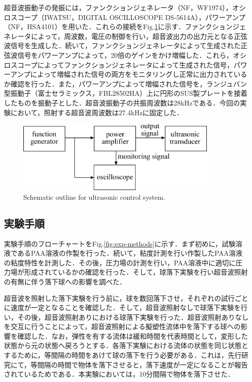 超音波振動子の発振には，ファンクションジェネレータ（NF，WF1974），オシロスコープ（IWATSU，DIGITAL OSCILLOSCOPE DS-5614A），パワーアンプ（NF，HSA4101）を用いた．これらの接続をFig.\ref{fig:connect-with-signal}に示す．ファンクションジェネレータによって，周波数，電圧の制御を行い，超音波出力の出力元となる正弦波信号を生成した．続いて，ファンクションジェネレータによって生成された正弦波信号をパワーアンプによって，20倍のゲインをかけ増幅した．これら，オシロスコープによってファンクションジェネレータによって生成された信号，パワーアンプによって増幅された信号の両方をモニタリングし正常に出力されているか確認を行った．また，パワーアンプによって増幅された信号を，ランジュバン型振動子（富士セラミックス，FBL28502HA）上に円形のSUS製プレートを接着したものを振動子とした．超音波振動子の共振周波数は28kHzである．今回の実験において，照射する超音波周波数は27.4kHzに固定した．

\begin{figure}[h]
    \centering
    \includegraphics[clip,width=10.0cm]{2-Methods/connect-with-signal.png}
    \caption{Schematic outline for ultrasonic control system.}
    \label{fig:connect-with-signal}
\end{figure}

\subsection{実験手順}

実験手順のフローチャートをFig.\ref{fig:exp-methods}に示す．まず初めに，試験溶液であるPAA溶液の作製を行った．続いて，粘度計測を行い作製したPAA溶液の粘度特性を計測した．その後，圧力場の計測を行い，PAA溶液中に適切に圧力場が形成されているかの確認を行った．そして，球落下実験を行い超音波照射の有無に伴う落下球への影響を調べた．

超音波を照射した落下実験を行う前に，球を数回落下させ，それぞれの試行ごとに速度が一定となることを確認した．そして，超音波照射なしで球落下実験を行い，その後，超音波照射ありにおける球落下実験を行った．超音波照射ありなしを交互に行うことによって，超音波照射による擬塑性流体中を落下する球への影響を確認した．なお，弾性を有する流体は緩和時間を代表時間として，変形した状態から元の状態へ戻ろうとする．各落下実験における流体の状態を同じ状態とするために，等間隔の時間をあけて球の落下を行う必要がある．これは，先行研究\cite{ref:8-5}にて，等間隔の時間で物体を落下させると，落下速度が一定になることが報告されているためである．本実験においては，10分間隔で物体を落下させた．

